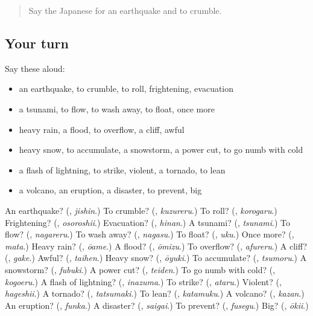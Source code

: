 \label{lesson:JA-R279-review-274-279}



\begin{quote}
Say the Japanese for an earthquake and to crumble.
\end{quote}

\subsection*{Your turn}
Say these aloud:

\begin{itemize}
\raggedright
  \item an earthquake, to crumble, to roll, frightening, evacuation
  \item a tsunami, to flow, to wash away, to float, once more
  \item heavy rain, a flood, to overflow, a cliff, awful
  \item heavy snow, to accumulate, a snowstorm, a power cut, to go numb with cold
  \item a flash of lightning, to strike, violent, a tornado, to lean
  \item a volcano, an eruption, a disaster, to prevent, big
\end{itemize}

\begin{tcolorbox}[breakable,colback=teal!4,colframe=teal!35!black,title={Before you move on}]
An earthquake? (\textbf{}, \emph{jishin}.) To crumble? (\textbf{}, \emph{kuzureru}.) To roll? (\textbf{}, \emph{korogaru}.) Frightening? (\textbf{}, \emph{osoroshii}.) Evacuation? (\textbf{}, \emph{hinan}.) A tsunami? (\textbf{}, \emph{tsunami}.) To flow? (\textbf{}, \emph{nagareru}.) To wash away? (\textbf{}, \emph{nagasu}.) To float? (\textbf{}, \emph{uku}.) Once more? (\textbf{}, \emph{mata}.) Heavy rain? (\textbf{}, \emph{ōame}.) A flood? (\textbf{}, \emph{ōmizu}.) To overflow? (\textbf{}, \emph{afureru}.) A cliff? (\textbf{}, \emph{gake}.) Awful? (\textbf{}, \emph{taihen}.) Heavy snow? (\textbf{}, \emph{ōyuki}.) To accumulate? (\textbf{}, \emph{tsumoru}.) A snowstorm? (\textbf{}, \emph{fubuki}.) A power cut? (\textbf{}, \emph{teiden}.) To go numb with cold? (\textbf{}, \emph{kogoeru}.) A flash of lightning? (\textbf{}, \emph{inazuma}.) To strike? (\textbf{}, \emph{ataru}.) Violent? (\textbf{}, \emph{hageshii}.) A tornado? (\textbf{}, \emph{tatsumaki}.) To lean? (\textbf{}, \emph{katamuku}.) A volcano? (\textbf{}, \emph{kazan}.) An eruption? (\textbf{}, \emph{funka}.) A disaster? (\textbf{}, \emph{saigai}.) To prevent? (\textbf{}, \emph{fusegu}.) Big? (\textbf{}, \emph{ōkii}.)
\end{tcolorbox}
